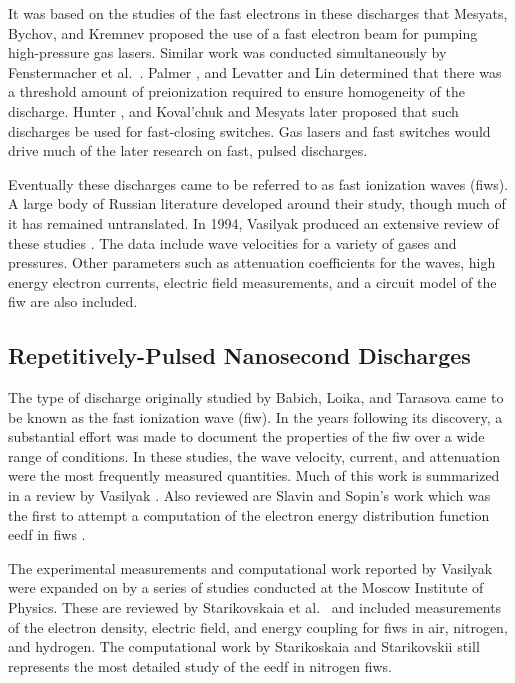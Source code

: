 It was based on the studies of the fast electrons in these discharges that
Mesyats, Bychov, and Kremnev proposed the use of a fast electron beam for
pumping high-pressure gas lasers. Similar work was conducted simultaneously by
Fenstermacher et al.~\cite{Fenstermacher1972}. Palmer \cite{Palmer1974}, and
Levatter and Lin \cite{Levatter1980} determined that there was a threshold
amount of preionization required to ensure homogeneity of the discharge. Hunter
\cite{Hunter1976}, and Koval'chuk and Mesyats \cite{Koval'chuk1976} later
proposed that such discharges be used for fast-closing switches. Gas lasers and
fast switches would drive much of the later research on fast, pulsed discharges.

Eventually these discharges came to be referred to as fast ionization waves
(\acs{fiw}s). A large body of Russian literature developed around their study,
though much of it has remained untranslated. In 1994, Vasilyak produced an
extensive review of these studies \cite{Vasilyak1994}. The data include wave
velocities for a variety of gases and pressures. Other parameters such as
attenuation coefficients for the waves, high energy electron currents, electric
field measurements, and a circuit model of the \acs{fiw} are also included.

\subsection{Repetitively-Pulsed Nanosecond Discharges}

The type of discharge originally studied by Babich, Loika, and Tarasova came to
be known as the fast ionization wave (\acs{fiw}). In the years following its
discovery, a substantial effort was made to document the properties of the
\acs{fiw} over a wide range of conditions. In these studies, the wave velocity,
current, and attenuation were the most frequently measured quantities. Much of
this work is summarized in a review by Vasilyak \cite{Vasilyak1994}. Also
reviewed are Slavin and Sopin's work which was the first to attempt a
computation of the electron energy distribution function \acs{eedf} in
\acs{fiw}s \cite{Slavin1992}.

The experimental measurements and computational work reported by Vasilyak were
expanded on by a series of studies conducted at the Moscow Institute of Physics.
These are reviewed by Starikovskaia et al.~\cite{Starikovskaia2001} and included
measurements of the electron density, electric field, and energy coupling for
\acs{fiw}s in air, nitrogen, and hydrogen. The computational work by
Starikoskaia and Starikovskii \cite{Starikovskaia2001a} still represents the
most detailed study of the \acs{eedf} in nitrogen \acs{fiw}s.

